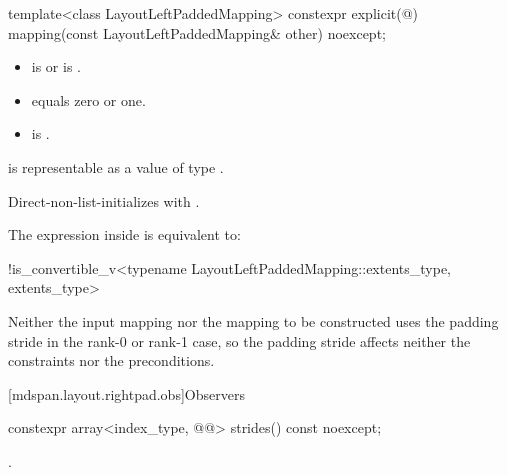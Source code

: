 %
\begin{itemdecl}
template<class LayoutLeftPaddedMapping>
  constexpr explicit(@\seebelow@)
    mapping(const LayoutLeftPaddedMapping& other) noexcept;
\end{itemdecl}

\begin{itemdescr}
\pnum
\constraints
\begin{itemize}
\item
{}
is  or\newline
{}
is .
\item
{} equals zero or one.
\item
{}\newline
is .
\end{itemize}

\pnum
\expects
{} is representable as
a value of type .

\pnum
\effects
Direct-non-list-initializes  with .

\pnum
\remarks
The expression inside  is equivalent to:
\begin{codeblock}
!is_convertible_v<typename LayoutLeftPaddedMapping::extents_type, extents_type>
\end{codeblock}
\begin{note}
Neither the input mapping nor the mapping to be constructed
uses the padding stride in the rank-0 or rank-1 case,
so the padding stride affects neither the constraints nor the preconditions.
\end{note}
\end{itemdescr}

[mdspan.layout.rightpad.obs]{Observers}

%
\begin{itemdecl}
constexpr array<index_type, @@> strides() const noexcept;
\end{itemdecl}

\begin{itemdescr}
\pnum
\returns
{}.
\end{itemdescr}

